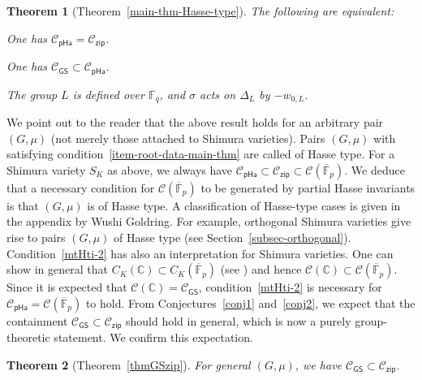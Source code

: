 \documentclass[11pt]{amsart}
\numberwithin{equation}{section}
\newtheorem{thmIntro}{Theorem}
\theoremstyle{definition}
\theoremstyle{remark}
\newcommand{\pha}{\mathsf{pHa}}
\newcommand{\zipsf}{\mathsf{zip}}
\newcommand{\GSsf}{\mathsf{GS}}
\newcommand{\Ccal}{{\mathcal C}}
\newcommand{\CC}{\mathbb{C}}
\newcommand{\FF}{\mathbb{F}}
\begin{document}
\begin{thmIntro}[Theorem~\ref{main-thm-Hasse-type}]\label{main-thm-Hasse-type-intro}
The following are equivalent:
\begin{equivlist}
\item\label{mtHti-1} One has $\Ccal_{\pha} = \Ccal_{\zipsf}$.
\item\label{mtHti-2} One has $\Ccal_{\GSsf}\subset \Ccal_{\pha}$.
\item
\label{item-root-data-main-thm}
The group $L$ is defined over $\FF_q$, and $\sigma$ acts on $\Delta_L$ by $-w_{0,L}$.
\end{equivlist}
\end{thmIntro}

We point out to the reader that the above result holds for an arbitrary pair $(G,\mu)$ (not merely those attached to Shimura varieties). Pairs $(G,\mu)$ with satisfying condition~\eqref{item-root-data-main-thm} are called of Hasse type. For a Shimura variety $S_K$ as above, we always have $\Ccal_{\pha}\subset \Ccal_{\zipsf}\subset \Ccal(\overline{\FF}_p)$. We deduce that a necessary condition for $\Ccal(\overline{\FF}_p)$ to be generated by partial Hasse invariants is that $(G,\mu)$ is of Hasse type. A classification of Hasse-type cases is given in the appendix by Wushi Goldring. For example, orthogonal Shimura varieties give rise to pairs $(G,\mu)$ of Hasse type (see Section~\ref{subsec-orthogonal}). Condition~\eqref{mtHti-2} has also an interpretation for Shimura varieties. One can show in general that $C_K(\CC)  \subset C_K(\overline{\FF}_p)$ (see \cite[Proposition 1.8.3]{Koskivirta-automforms-GZip}) and hence $\Ccal(\CC)\subset \Ccal(\overline{\FF}_p)$. Since it is expected that $\Ccal(\CC) = \Ccal_{\GSsf}$, condition~\eqref{mtHti-2} is necessary for $\Ccal_{\pha} = \Ccal(\overline{\FF}_p)$ to hold. From Conjectures~\ref{conj1} and~\ref{conj2}, we expect that the containment $\Ccal_{\GSsf}\subset \Ccal_{\zipsf}$ should hold in general, which is now a purely group-theoretic statement. We confirm this expectation. 

\begin{thmIntro}[Theorem~\ref{thmGSzip}]\label{thm2}
For general $(G,\mu)$, we have $\Ccal_{\GSsf}\subset \Ccal_{\zipsf}$.
\end{thmIntro}
\end{document}
